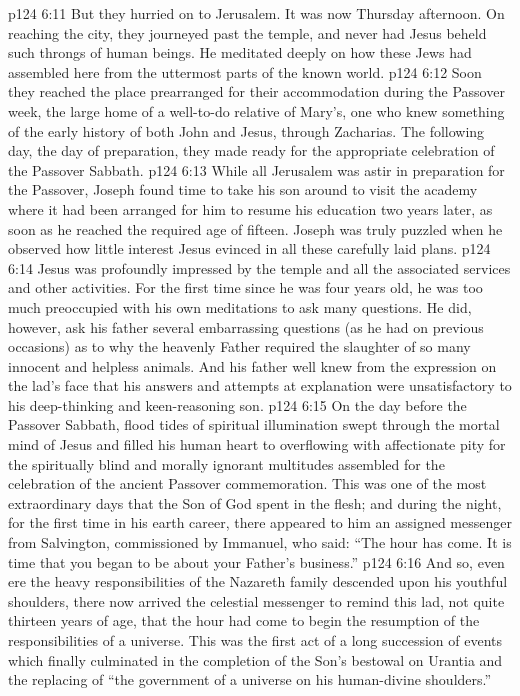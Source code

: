 \vs p124 6:11 But they hurried on to Jerusalem. It was now Thursday afternoon. On reaching the city, they journeyed past the temple, and never had Jesus beheld such throngs of human beings. He meditated deeply on how these Jews had assembled here from the uttermost parts of the known world.
\vs p124 6:12 Soon they reached the place prearranged for their accommodation during the Passover week, the large home of a well\hyp{}to\hyp{}do relative of Mary’s, one who knew something of the early history of both John and Jesus, through Zacharias. The following day, the day of preparation, they made ready for the appropriate celebration of the Passover Sabbath.
\vs p124 6:13 While all Jerusalem was astir in preparation for the Passover, Joseph found time to take his son around to visit the academy where it had been arranged for him to resume his education two years later, as soon as he reached the required age of fifteen. Joseph was truly puzzled when he observed how little interest Jesus evinced in all these carefully laid plans.
\vs p124 6:14 Jesus was profoundly impressed by the temple and all the associated services and other activities. For the first time since he was four years old, he was too much preoccupied with his own meditations to ask many questions. He did, however, ask his father several embarrassing questions (as he had on previous occasions) as to why the heavenly Father required the slaughter of so many innocent and helpless animals. And his father well knew from the expression on the lad’s face that his answers and attempts at explanation were unsatisfactory to his deep\hyp{}thinking and keen\hyp{}reasoning son.
\pc \vs p124 6:15 On the day before the Passover Sabbath, flood tides of spiritual illumination swept through the mortal mind of Jesus and filled his human heart to overflowing with affectionate pity for the spiritually blind and morally ignorant multitudes assembled for the celebration of the ancient Passover commemoration. This was one of the most extraordinary days that the Son of God spent in the flesh; and during the night, for the first time in his earth career, there appeared to him an assigned messenger from Salvington, commissioned by Immanuel, who said: “The hour has come. It is time that you began to be about your Father’s business.”
\vs p124 6:16 And so, even ere the heavy responsibilities of the Nazareth family descended upon his youthful shoulders, there now arrived the celestial messenger to remind this lad, not quite thirteen years of age, that the hour had come to begin the resumption of the responsibilities of a universe. This was the first act of a long succession of events which finally culminated in the completion of the Son’s bestowal on Urantia and the replacing of “the government of a universe on his human\hyp{}divine shoulders.”
